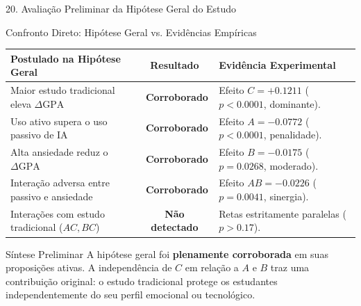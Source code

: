 \documentclass[aspectratio=169, 10pt]{beamer}
\newcommand{\cmark}{\textcolor{StatusGreen}{\ding{51}}}
\begin{document}
\begin{frame}{20. Avaliação Preliminar da Hipótese Geral do Estudo}
    \begin{exampleblock}{Confronto Direto: Hipótese Geral vs. Evidências Empíricas}
        \centering \small
        \begin{tabular}{p{4.8cm}cp{5.2cm}}
            \toprule
            \textbf{Postulado na Hipótese Geral} & \textbf{Resultado} & \textbf{Evidência Experimental} \\
            \midrule
            Maior estudo tradicional eleva $\Delta \text{GPA}$ & \cmark\ \textbf{Corroborado} & Efeito $C = +0.1211$ ($p < 0.0001$, dominante). \\
            Uso ativo supera o uso passivo de IA & \cmark\ \textbf{Corroborado} & Efeito $A = -0.0772$ ($p < 0.0001$, penalidade). \\
            Alta ansiedade reduz o $\Delta \text{GPA}$ & \cmark\ \textbf{Corroborado} & Efeito $B = -0.0175$ ($p = 0.0268$, moderado). \\
            Interação adversa entre passivo e ansiedade & \cmark\ \textbf{Corroborado} & Efeito $AB = -0.0226$ ($p = 0.0041$, sinergia). \\
            Interações com estudo tradicional ($AC, BC$) & \textbf{Não detectado} & Retas estritamente paralelas ($p > 0.17$). \\
            \bottomrule
        \end{tabular}
    \end{exampleblock}

    \vspace{4pt}

    \begin{block}{Síntese Preliminar}
        A hipótese geral foi \textbf{plenamente corroborada} em suas proposições ativas. A independência de $C$ em relação a $A$ e $B$ traz uma contribuição original: o estudo tradicional protege os estudantes independentemente do seu perfil emocional ou tecnológico.
    \end{block}
\end{frame}
\end{document}
